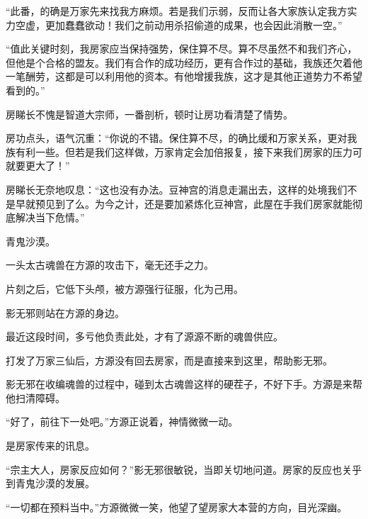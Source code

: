 \begin{this_body}
“此番，的确是万家先来找我方麻烦。若是我们示弱，反而让各大家族认定我方实力空虚，更加蠢蠢欲动！我们之前动用杀招偷道的成果，也会因此消散一空。”

“值此关键时刻，我房家应当保持强势，保住算不尽。算不尽虽然不和我们齐心，但他是个合格的盟友。我们有合作的成功经历，更有合作过的基础，我族还欠着他一笔酬劳，这都是可以利用他的资本。有他增援我族，这才是其他正道势力不希望看到的。”

房睇长不愧是智道大宗师，一番剖析，顿时让房功看清楚了情势。

房功点头，语气沉重：“你说的不错。保住算不尽，的确比缓和万家关系，更对我族有利一些。但若是我们这样做，万家肯定会加倍报复，接下来我们房家的压力可就要更大了！”

房睇长无奈地叹息：“这也没有办法。豆神宫的消息走漏出去，这样的处境我们不是早就预见到了么。为今之计，还是要加紧炼化豆神宫，此屋在手我们房家就能彻底解决当下危情。”

青鬼沙漠。

一头太古魂兽在方源的攻击下，毫无还手之力。

片刻之后，它低下头颅，被方源强行征服，化为己用。

影无邪则站在方源的身边。

最近这段时间，多亏他负责此处，才有了源源不断的魂兽供应。

打发了万家三仙后，方源没有回去房家，而是直接来到这里，帮助影无邪。

影无邪在收编魂兽的过程中，碰到太古魂兽这样的硬茬子，不好下手。方源是来帮他扫清障碍。

“好了，前往下一处吧。”方源正说着，神情微微一动。

是房家传来的讯息。

“宗主大人，房家反应如何？”影无邪很敏锐，当即关切地问道。房家的反应也关乎到青鬼沙漠的发展。

“一切都在预料当中。”方源微微一笑，他望了望房家大本营的方向，目光深幽。

\end{this_body}

